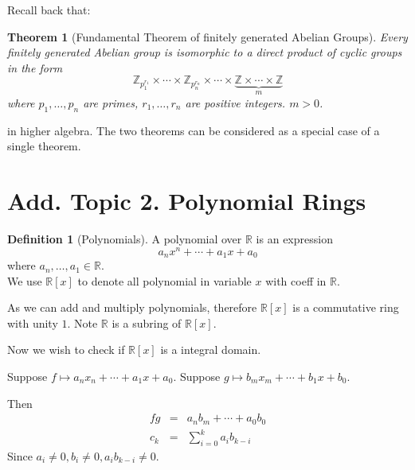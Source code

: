 \documentclass{article}
\theoremstyle{MyNonumberplain}
\theoremstyle{break}
\theoremstyle{break}
\newtheorem{theorem}{Theorem}[section]
\theoremstyle{break}
\theoremstyle{definition}
\theoremstyle{break}
\newtheorem{definition}{Definition}[section]
\begin{document}
Recall back that:

\begin{thmbox}
    \begin{theorem}[Fundamental Theorem of finitely generated Abelian Groups]
    
        Every finitely generated Abelian group is isomorphic to a
        direct product of cyclic groups in the form
        \[ \mathbb{Z}_{p_1^{r_1}} \times \cdots \times \mathbb{Z}_{p_n^{r_n}} \times
           \cdots \times \underset{m}{\underbrace{\mathbb{Z} \times \cdots \times
           \mathbb{Z}}} \]
        where $p_1, \ldots, p_n$ are primes, $r_1, \ldots, r_n$ are positive
        integers. $m > 0$. 
      \end{theorem}
\end{thmbox}
in higher algebra. The two theorems can be considered as a special case of a single theorem.

\newpage

\section{Add. Topic 2. Polynomial Rings}

\begin{defbox}
    \begin{definition}[Polynomials]
        A polynomial over $\mathbb{R}$ is an expression
        \[ a_n x^n + \cdots + a_1 x + a_0 \]
        where $a_n, \ldots, a_1 \in \mathbb{R}$.\\
        
        We use $\mathbb{R} [x]$ to denote all polynomial in variable $x$ with coeff in
        $\mathbb{R}$.
    \end{definition}
\end{defbox}

As we can add and multiply polynomials, therefore $\mathbb{R} [x]$ is a
commutative ring with unity $1$. Note $\mathbb{R}$ is a subring of $\mathbb{R}
[x]$.

Now we wish to check if $\mathbb{R} [x]$ is a integral domain.

Suppose $f \mapsto a_n x_n + \cdots + a_1 x + a_0$. Suppose $g \mapsto b_m
x_m + \cdots + b_1 x + b_0$.

Then
\begin{eqnarray*}
  f g & = & a_n b_m + \cdots + a_0 b_0\\
  c_k & = & \sum^k_{i = 0} a_i b_{k - i}
\end{eqnarray*}
Since $a_i \neq 0, b_i \neq 0, a_i b_{k - i} \neq 0$.
\end{document}

